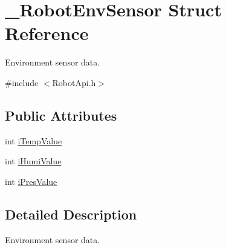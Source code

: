 \hypertarget{struct__RobotEnvSensor}{\section{\-\_\-\-Robot\-Env\-Sensor Struct Reference}
\label{struct__RobotEnvSensor}
}


Environment sensor data.  




{\ttfamily \#include $<$Robot\-Api.\-h$>$}

\subsection*{Public Attributes}
\begin{DoxyCompactItemize}
\item 
int \hyperlink{struct__RobotEnvSensor_ab0ae3d1ccf7267172b5e03e36fb9b469}{i\-Temp\-Value}
\item 
int \hyperlink{struct__RobotEnvSensor_ac1bc83ccd0caff88b187ff45ce320d9b}{i\-Humi\-Value}
\item 
int \hyperlink{struct__RobotEnvSensor_ae80bf4f6e67afa6d239b31fa5b8d732e}{i\-Pres\-Value}
\end{DoxyCompactItemize}


\subsection{Detailed Description}
Environment sensor data. 

